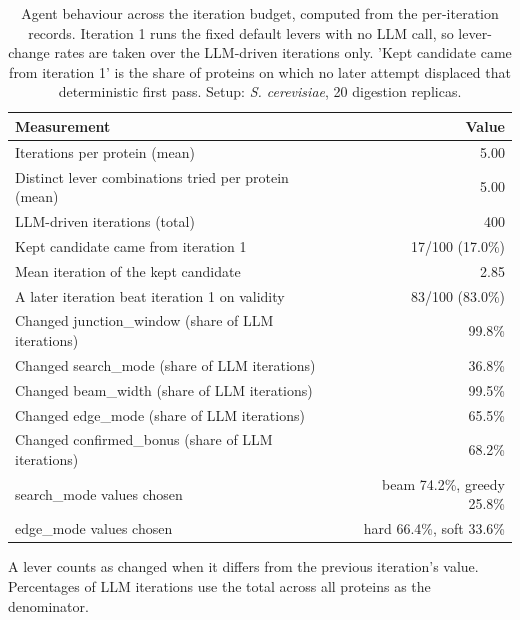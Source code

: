 \begin{table}[!tb]
  \centering
  \caption{Agent behaviour across the iteration budget, computed from the per-iteration records. Iteration 1 runs the fixed default levers with no LLM call, so lever-change rates are taken over the LLM-driven iterations only. 'Kept candidate came from iteration 1' is the share of proteins on which no later attempt displaced that deterministic first pass. Setup: \textnormal{\textnormal{\textit{S. cerevisiae}}}, 20 digestion replicas.}
  \label{tab:agent_behaviour_yeast_r20}
  \begin{tabular}{lr}
    \toprule
    Measurement & Value \\
    \midrule
    Iterations per protein (mean) & 5.00 \\
    Distinct lever combinations tried per protein (mean) & 5.00 \\
    LLM-driven iterations (total) & 400 \\
    Kept candidate came from iteration 1 & 17/100 (17.0\%) \\
    Mean iteration of the kept candidate & 2.85 \\
    A later iteration beat iteration 1 on validity & 83/100 (83.0\%) \\
    Changed junction\_window (share of LLM iterations) & 99.8\% \\
    Changed search\_mode (share of LLM iterations) & 36.8\% \\
    Changed beam\_width (share of LLM iterations) & 99.5\% \\
    Changed edge\_mode (share of LLM iterations) & 65.5\% \\
    Changed confirmed\_bonus (share of LLM iterations) & 68.2\% \\
    search\_mode values chosen & beam 74.2\%, greedy 25.8\% \\
    edge\_mode values chosen & hard 66.4\%, soft 33.6\% \\
    \bottomrule
  \end{tabular}
  \par\smallskip\footnotesize{A lever counts as changed when it differs from the previous iteration's value. Percentages of LLM iterations use the total across all proteins as the denominator.}
\end{table}

